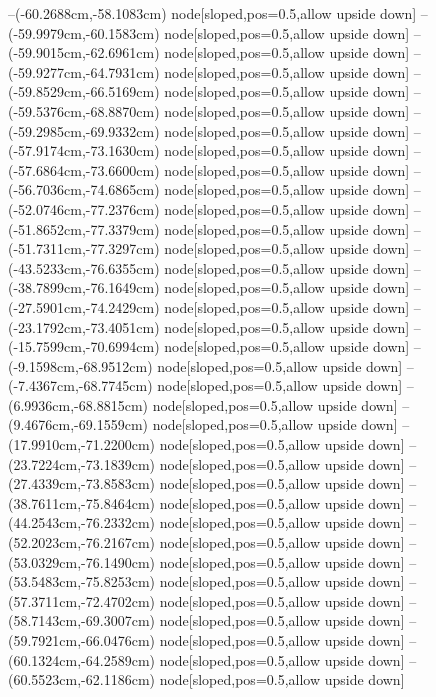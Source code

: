 --(-60.2688cm,-58.1083cm) node[sloped,pos=0.5,allow upside down]{\ArrowIn}
--(-59.9979cm,-60.1583cm) node[sloped,pos=0.5,allow upside down]{\ArrowIn}
--(-59.9015cm,-62.6961cm) node[sloped,pos=0.5,allow upside down]{\ArrowIn}
--(-59.9277cm,-64.7931cm) node[sloped,pos=0.5,allow upside down]{\ArrowIn}
--(-59.8529cm,-66.5169cm) node[sloped,pos=0.5,allow upside down]{\ArrowIn}
--(-59.5376cm,-68.8870cm) node[sloped,pos=0.5,allow upside down]{\ArrowIn}
--(-59.2985cm,-69.9332cm) node[sloped,pos=0.5,allow upside down]{\ArrowIn}
--(-57.9174cm,-73.1630cm) node[sloped,pos=0.5,allow upside down]{\ArrowIn}
--(-57.6864cm,-73.6600cm) node[sloped,pos=0.5,allow upside down]{\arrowIn}
--(-56.7036cm,-74.6865cm) node[sloped,pos=0.5,allow upside down]{\ArrowIn}
--(-52.0746cm,-77.2376cm) node[sloped,pos=0.5,allow upside down]{\ArrowIn}
--(-51.8652cm,-77.3379cm) node[sloped,pos=0.5,allow upside down]{\arrowIn}
--(-51.7311cm,-77.3297cm) node[sloped,pos=0.5,allow upside down]{\arrowIn}
--(-43.5233cm,-76.6355cm) node[sloped,pos=0.5,allow upside down]{\ArrowIn}
--(-38.7899cm,-76.1649cm) node[sloped,pos=0.5,allow upside down]{\ArrowIn}
--(-27.5901cm,-74.2429cm) node[sloped,pos=0.5,allow upside down]{\ArrowIn}
--(-23.1792cm,-73.4051cm) node[sloped,pos=0.5,allow upside down]{\ArrowIn}
--(-15.7599cm,-70.6994cm) node[sloped,pos=0.5,allow upside down]{\ArrowIn}
--(-9.1598cm,-68.9512cm) node[sloped,pos=0.5,allow upside down]{\ArrowIn}
--(-7.4367cm,-68.7745cm) node[sloped,pos=0.5,allow upside down]{\ArrowIn}
--(6.9936cm,-68.8815cm) node[sloped,pos=0.5,allow upside down]{\ArrowIn}
--(9.4676cm,-69.1559cm) node[sloped,pos=0.5,allow upside down]{\ArrowIn}
--(17.9910cm,-71.2200cm) node[sloped,pos=0.5,allow upside down]{\ArrowIn}
--(23.7224cm,-73.1839cm) node[sloped,pos=0.5,allow upside down]{\ArrowIn}
--(27.4339cm,-73.8583cm) node[sloped,pos=0.5,allow upside down]{\ArrowIn}
--(38.7611cm,-75.8464cm) node[sloped,pos=0.5,allow upside down]{\ArrowIn}
--(44.2543cm,-76.2332cm) node[sloped,pos=0.5,allow upside down]{\ArrowIn}
--(52.2023cm,-76.2167cm) node[sloped,pos=0.5,allow upside down]{\ArrowIn}
--(53.0329cm,-76.1490cm) node[sloped,pos=0.5,allow upside down]{\arrowIn}
--(53.5483cm,-75.8253cm) node[sloped,pos=0.5,allow upside down]{\arrowIn}
--(57.3711cm,-72.4702cm) node[sloped,pos=0.5,allow upside down]{\ArrowIn}
--(58.7143cm,-69.3007cm) node[sloped,pos=0.5,allow upside down]{\ArrowIn}
--(59.7921cm,-66.0476cm) node[sloped,pos=0.5,allow upside down]{\ArrowIn}
--(60.1324cm,-64.2589cm) node[sloped,pos=0.5,allow upside down]{\ArrowIn}
--(60.5523cm,-62.1186cm) node[sloped,pos=0.5,allow upside down]{\ArrowIn}
